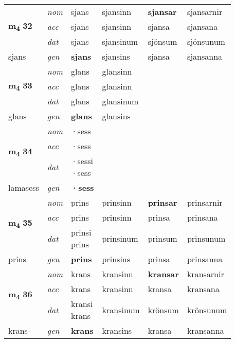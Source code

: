 \begin{longtable}[l]{X>{\footnotesize\itshape}XXXXX}
\multirow{3}{*}{{{\textbf{m{\textsubscript{4}}} \Large{\textbf{32}}}}}  
 & nom & sjans & sjansinn    & \textbf{sjansar} & sjansarnir  \\*
 & acc & sjans  & sjansinn   & sjansa  & sjansana \\*
 & dat & sjans & sjansinum   & sjönsum & sjönsunum \\*
 {\footnotesize{sjans}} &  gen & \textbf{sjans}  & sjansins  & sjansa & sjansanna \\
\cmidrule{1-6}


\multirow{3}{*}{{{\textbf{m{\textsubscript{4}}} \Large{\textbf{33}}}}}  
 & nom & glans & glansinn    & \textbf{} &   \\*
 & acc & glans  & glansinn   &   &  \\*
 & dat & glans & glansinum   &  &  \\*
 {\footnotesize{glans}} &  gen & \textbf{glans}  & glansins  &  &  \\
\cmidrule{1-6}


\multirow{3}{*}{{{\textbf{m{\textsubscript{4}}} \Large{\textbf{34}}}}}  
 & nom & ·sess &     & \textbf{} &   \\*
 & acc & ·sess  &    &   &  \\*
 & dat & \specialcell{·sessi\\  ·sess} &    &  &  \\*
 {\footnotesize{lamasess}} &  gen & \textbf{·sess}  &   &  &  \\
\cmidrule{1-6}


\multirow{3}{*}{{{\textbf{m{\textsubscript{4}}} \Large{\textbf{35}}}}}  
 & nom & prins & prinsinn    & \textbf{prinsar} & prinsarnir  \\*
 & acc & prins  & prinsinn   & prinsa  & prinsana \\*
 & dat & \specialcell{prinsi\\ prins} & prinsinum   & prinsum & prinsunum \\*
 {\footnotesize{prins}} &  gen & \textbf{prins}  & prinsins  & prinsa & prinsanna \\
\cmidrule{1-6}


\multirow{3}{*}{{{\textbf{m{\textsubscript{4}}} \Large{\textbf{36}}}}}  
 & nom & krans & kransinn    & \textbf{kransar} & kransarnir  \\*
 & acc & krans  & kransinn   & kransa  & kransana \\*
 & dat & \specialcell{kransi\\ krans} & kransinum   & krönsum & krönsunum \\*
 {\footnotesize{krans}} &  gen & \textbf{krans}  & kransins  & kransa & kransanna \\
\cmidrule{1-6}



\end{longtable}
